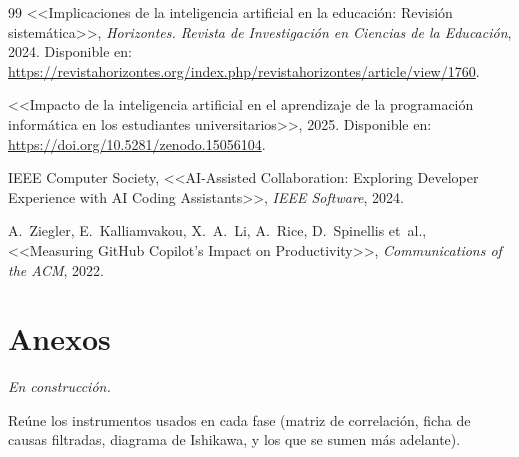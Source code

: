 \documentclass[12pt,a4paper,oneside]{report}
\begin{document}
\begin{thebibliography}{99}
<<Implicaciones de la inteligencia artificial en la educación: Revisión sistemática>>, \textit{Horizontes. Revista de Investigación en Ciencias de la Educación}, 2024. Disponible en: \url{https://revistahorizontes.org/index.php/revistahorizontes/article/view/1760}.

<<Impacto de la inteligencia artificial en el aprendizaje de la programación informática en los estudiantes universitarios>>, 2025. Disponible en: \url{https://doi.org/10.5281/zenodo.15056104}.

IEEE Computer Society, <<AI-Assisted Collaboration: Exploring Developer Experience with AI Coding Assistants>>, \textit{IEEE Software}, 2024.

A.~Ziegler, E.~Kalliamvakou, X.~A.~Li, A.~Rice, D.~Spinellis et~al., <<Measuring GitHub Copilot's Impact on Productivity>>, \textit{Communications of the ACM}, 2022.

\end{thebibliography}

\appendix
\chapter*{Anexos}

\textit{En construcción.}

Reúne los instrumentos usados en cada fase (matriz de correlación, ficha de causas filtradas, diagrama de Ishikawa, y los que se sumen más adelante).
\end{document}
